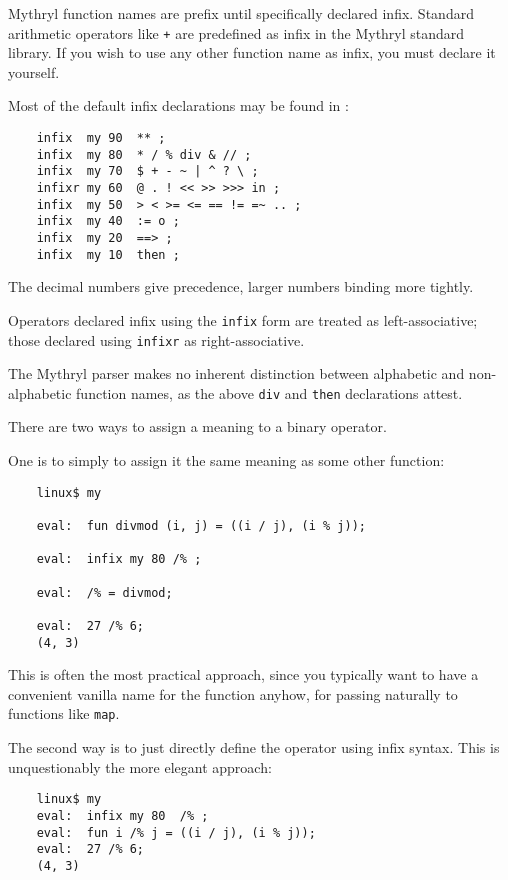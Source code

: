 Mythryl function names are prefix until specifically declared infix.  Standard 
arithmetic operators like {\tt +} are predefined as infix in the Mythryl standard 
library.  If you wish to use any other function name as infix, you must declare it 
yourself.

Most of the default infix declarations may be found in 
:
\begin{verbatim}
    infix  my 90  ** ;
    infix  my 80  * / % div & // ;
    infix  my 70  $ + - ~ | ^ ? \ ;
    infixr my 60  @ . ! << >> >>> in ;
    infix  my 50  > < >= <= == != =~ .. ;
    infix  my 40  := o ;
    infix  my 20  ==> ;
    infix  my 10  then ;
\end{verbatim}

The decimal numbers give precedence, larger numbers binding more tightly.

Operators declared infix using the {\tt infix} form are treated as 
left-associative;  those declared using {\tt infixr} as right-associative.

The Mythryl parser makes no inherent distinction between alphabetic and 
non-alphabetic function names, as the above {\tt div} and {\tt then} 
declarations attest.

There are two ways to assign a meaning to a binary operator.

One is to simply to assign it the same meaning as some other function:

\begin{verbatim}
    linux$ my

    eval:  fun divmod (i, j) = ((i / j), (i % j));

    eval:  infix my 80 /% ;

    eval:  /% = divmod;

    eval:  27 /% 6;
    (4, 3)
\end{verbatim}

This is often the most practical approach, since you typically want 
to have a convenient vanilla name for the function anyhow, for 
passing naturally to functions like {\tt map}.

The second way is to just directly define the operator 
using infix syntax.  This is unquestionably the more elegant approach:

\begin{verbatim}
    linux$ my
    eval:  infix my 80  /% ;
    eval:  fun i /% j = ((i / j), (i % j));
    eval:  27 /% 6;
    (4, 3)
\end{verbatim}


